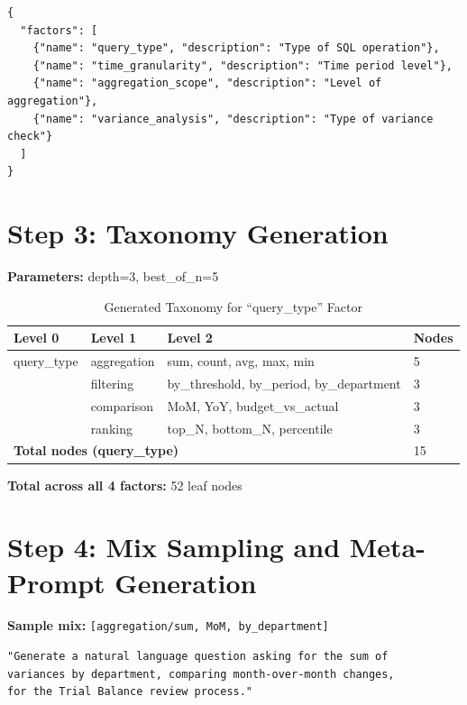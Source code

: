 \begin{lstlisting}[language=jsonx,caption={Factors (factors.json)}]
{
  "factors": [
    {"name": "query_type", "description": "Type of SQL operation"},
    {"name": "time_granularity", "description": "Time period level"},
    {"name": "aggregation_scope", "description": "Level of aggregation"},
    {"name": "variance_analysis", "description": "Type of variance check"}
  ]
}
\end{lstlisting}

\section{Step 3: Taxonomy Generation}

\textbf{Parameters:} depth=3, best\_of\_n=5

\begin{table}[H]
\centering
\caption{Generated Taxonomy for ``query\_type'' Factor}
\begin{tabular}{llll}
\toprule
\textbf{Level 0} & \textbf{Level 1} & \textbf{Level 2} & \textbf{Nodes} \\
\midrule
query\_type & aggregation & sum, count, avg, max, min & 5 \\
            & filtering & by\_threshold, by\_period, by\_department & 3 \\
            & comparison & MoM, YoY, budget\_vs\_actual & 3 \\
            & ranking & top\_N, bottom\_N, percentile & 3 \\
\midrule
\multicolumn{3}{l}{\textbf{Total nodes (query\_type)}} & 15 \\
\bottomrule
\end{tabular}
\end{table}

\textbf{Total across all 4 factors:} 52 leaf nodes

\section{Step 4: Mix Sampling and Meta-Prompt Generation}

\textbf{Sample mix:} \texttt{[aggregation/sum, MoM, by\_department]}

\begin{lstlisting}[language=jsonx,caption={Meta-prompt generated}]
"Generate a natural language question asking for the sum of 
variances by department, comparing month-over-month changes, 
for the Trial Balance review process."
\end{lstlisting}


